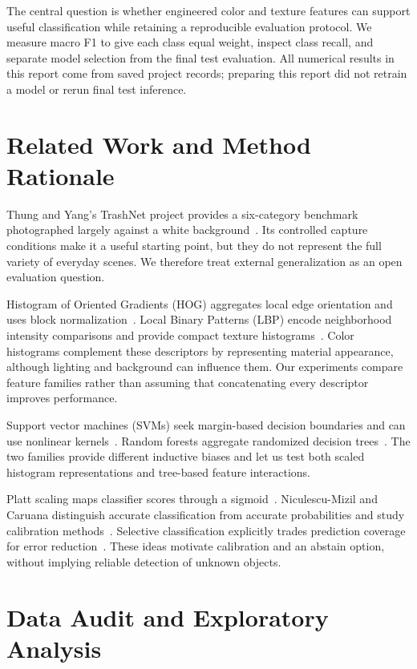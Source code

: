 \documentclass[conference]{IEEEtran}
\begin{document}
The central question is whether engineered color and texture features can support useful classification while retaining a reproducible evaluation protocol. We measure macro F1 to give each class equal weight, inspect class recall, and separate model selection from the final test evaluation. All numerical results in this report come from saved project records; preparing this report did not retrain a model or rerun final test inference.

\section{Related Work and Method Rationale}
Thung and Yang's TrashNet project provides a six-category benchmark photographed largely against a white background~\cite{yang2016trashnet}. Its controlled capture conditions make it a useful starting point, but they do not represent the full variety of everyday scenes. We therefore treat external generalization as an open evaluation question.

Histogram of Oriented Gradients (HOG) aggregates local edge orientation and uses block normalization~\cite{dalal2005hog}. Local Binary Patterns (LBP) encode neighborhood intensity comparisons and provide compact texture histograms~\cite{ojala2002lbp}. Color histograms complement these descriptors by representing material appearance, although lighting and background can influence them. Our experiments compare feature families rather than assuming that concatenating every descriptor improves performance.

Support vector machines (SVMs) seek margin-based decision boundaries and can use nonlinear kernels~\cite{cortes1995svm}. Random forests aggregate randomized decision trees~\cite{breiman2001randomforest}. The two families provide different inductive biases and let us test both scaled histogram representations and tree-based feature interactions.

Platt scaling maps classifier scores through a sigmoid~\cite{platt1999probabilistic}. Niculescu-Mizil and Caruana distinguish accurate classification from accurate probabilities and study calibration methods~\cite{niculescu2005predicting}. Selective classification explicitly trades prediction coverage for error reduction~\cite{elyaniv2010selective}. These ideas motivate calibration and an abstain option, without implying reliable detection of unknown objects.

\section{Data Audit and Exploratory Analysis}
\end{document}
